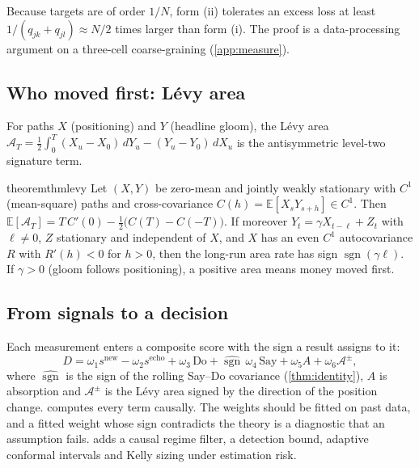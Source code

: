 \documentclass{article}
\theoremstyle{plain}
\theoremstyle{definition}
\theoremstyle{remark}
\newcommand{\E}{\mathbb{E}}
\DeclareMathOperator{\sgn}{sgn}
\begin{document}
Because targets are of order $1/N$, form (ii) tolerates an excess loss at least $1/(q_{jk}+q_{jl})\approx N/2$ times larger than form (i). The proof is a data-processing argument on a three-cell coarse-graining (\cref{app:measure}).

\subsection{Who moved first: L\'evy area}\label{sec:leadlag}

For paths $X$ (positioning) and $Y$ (headline gloom), the L\'evy area $\mathcal{A}_T=\frac12\int_0^T(X_u-X_0)\,dY_u-(Y_u-Y_0)\,dX_u$ is the antisymmetric level-two signature term.

\begin{restatable}{theorem}{thmlevy}\label{thm:levy}
Let $(X,Y)$ be zero-mean and jointly weakly stationary with $C^1$ (mean-square) paths and cross-covariance $C(h)=\E[X_sY_{s+h}]\in C^1$. Then $\E[\mathcal{A}_T]=T\,C'(0)-\frac12\big(C(T)-C(-T)\big)$. If moreover $Y_t=\gamma X_{t-\ell}+Z_t$ with $\ell\neq0$, $Z$ stationary and independent of $X$, and $X$ has an even $C^1$ autocovariance $R$ with $R'(h)<0$ for $h>0$, then the long-run area rate has sign $\sgn(\gamma\ell)$. If $\gamma>0$ (gloom follows positioning), a positive area means money moved first.
\end{restatable}

\subsection{From signals to a decision}\label{sec:synthesis}

Each measurement enters a composite score with the sign a result assigns to it:
\begin{equation}\label{eq:composite}
  D=\omega_1s^{\text{new}}-\omega_2s^{\text{echo}}+\omega_3\,\text{Do}+\widehat{\sgn}\,\omega_4\,\text{Say}+\omega_5A+\omega_6\mathcal{A}^{\pm},
\end{equation}
where $\widehat{\sgn}$ is the sign of the rolling Say--Do covariance (\cref{thm:identity}), $A$ is absorption and $\mathcal{A}^{\pm}$ is the L\'evy area signed by the direction of the position change.  computes every term causally. The weights should be fitted on past data, and a fitted weight whose sign contradicts the theory is a diagnostic that an assumption fails.  adds a causal regime filter, a detection bound, adaptive conformal intervals and Kelly sizing under estimation risk.
\end{document}
